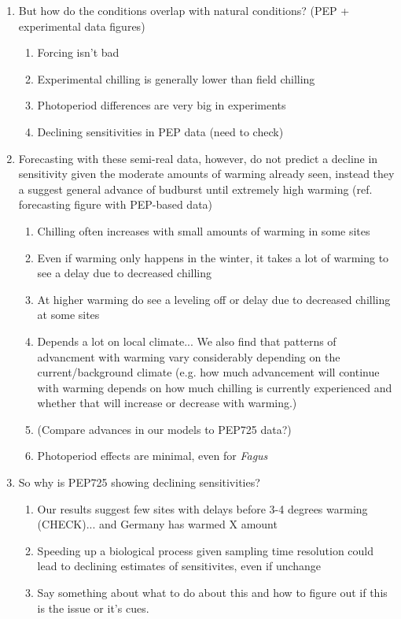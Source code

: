 \documentclass[11pt,letter]{article}
\begin{document}
\begin{enumerate}
\item But how do the conditions overlap with natural conditions? (PEP + experimental data figures)
\begin{enumerate}
\item Forcing isn't bad
\item Experimental chilling is generally lower than field chilling
\item Photoperiod differences are very big in experiments
\item Declining sensitivities in PEP data (need to check)
\end{enumerate}
\item Forecasting with these semi-real data, however, do not predict a decline in sensitivity given the moderate amounts of warming already seen, instead they a suggest general advance of budburst until extremely high warming (ref. forecasting figure with PEP-based data)
\begin{enumerate}
\item Chilling often increases with small amounts of warming in some sites
\item Even if warming only happens in the winter, it takes a lot of warming to see a delay due to decreased chilling
\item At higher warming do see a leveling off or delay due to decreased chilling at some sites
\item Depends a lot on local climate... We also find that patterns of advancment with warming vary considerably depending on the current/background climate (e.g. how much advancement will continue with warming depends on how much chilling is currently experienced and whether that will increase or decrease with warming.)
\item (Compare advances in our models to PEP725 data?)
\item Photoperiod effects are minimal, even for \emph{Fagus}
\end{enumerate}
\item So why is PEP725 showing declining sensitivities?
\begin{enumerate}
\item Our results suggest few sites with delays before 3-4 degrees warming (CHECK)... and Germany has warmed X amount
\item Speeding up a biological process given sampling time resolution could lead to declining estimates of sensitivites, even if unchange
\item Say something about what to do about this and how to figure out if this is the issue or it's cues. 

\end{enumerate}
\end{enumerate}
\end{document}
